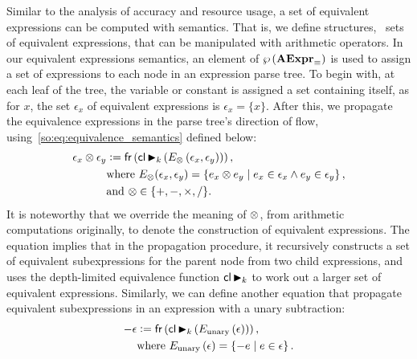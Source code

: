 Similar to the analysis of accuracy and resource usage, a set of equivalent
expressions can be computed with semantics. That is, we define structures,
\ie~sets of equivalent expressions, that can be manipulated with arithmetic
operators. In our equivalent expressions semantics, an element of
$\wp\left({\mathbf{AExpr}_\equiv}\right)$ is used to assign a set of expressions to each node
in an expression parse tree. To begin with, at each leaf of the tree, the
variable or constant is assigned a set containing itself, as for $x$, the set
$\epsilon_x$ of equivalent expressions is $\epsilon_x = \{x\}$. After this, we
propagate the equivalence expressions in the parse tree's direction of flow,
using~\eqref{so:eq:equivalence_semantics} defined below:
\begin{equation}
    \begin{aligned}
        \epsilon_x \otimes \epsilon_y &\vcentcolon= \operatorname{\mathsf{fr}}\left(
            \operatorname{\mathsf{cl}} \operatorname{\blacktriangleright}_k \left(
                E_\otimes \left( \epsilon_x, \epsilon_y \right)
            \right) \right), \\
        & \text{where~}
        E_\otimes(\epsilon_x, \epsilon_y) = \left\{
            e_x \otimes e_y \mid e_x \in \epsilon_x \wedge e_y \in \epsilon_y
        \right\}, \\
        & \text{and~} \otimes\in\{ +, -, \times, / \}.
    \end{aligned}
    \label{so:eq:equivalence_semantics}
\end{equation}
It is noteworthy that we override the meaning of $\otimes$, from arithmetic
computations originally, to denote the construction of equivalent expressions.
The equation implies that in the propagation procedure, it recursively
constructs a set of equivalent subexpressions for the parent node from two
child expressions, and uses the depth-limited equivalence function $\operatorname{\mathsf{cl}}
\operatorname{\blacktriangleright}_k$ to work out a larger set of equivalent expressions.  Similarly, we
can define another equation that propagate equivalent subexpressions in an
expression with a unary subtraction:
\begin{equation}
    \begin{aligned}
        -\epsilon &\vcentcolon= \operatorname{\mathsf{fr}}\left(
            \operatorname{\mathsf{cl}} \operatorname{\blacktriangleright}_k \left(
                E_{\mathrm{unary}} \left( \epsilon \right)
            \right) \right), \\
        & \text{where~}
        E_\mathrm{unary} \left( \epsilon \right) = \left\{
            -e \mid e \in \epsilon
        \right\}.
    \end{aligned}
    \label{so:eq:equivalence_semantics_unary}
\end{equation}

